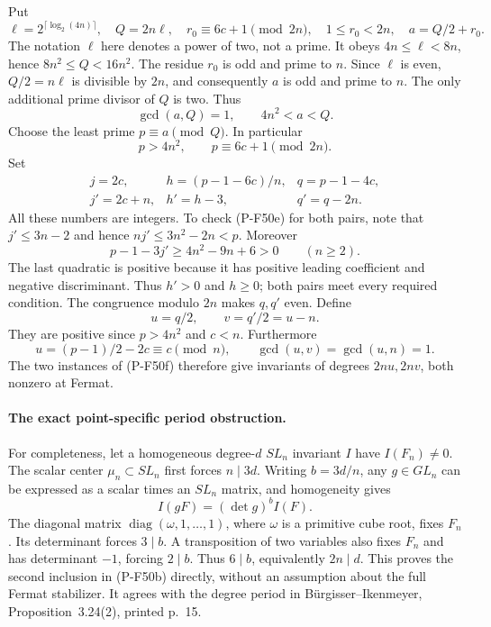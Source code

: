 Put
\[
 \ell=2^{\lceil\log_2(4n)\rceil},\quad Q=2n\ell,
 \quad r_0\equiv6c+1\pmod{2n},\quad 1\le r_0<2n,
 \quad a=Q/2+r_0.                                     \tag{P-F50k}
\]
The notation $\ell$ here denotes a power of two, not a
prime. It obeys $4n\le\ell<8n$, hence
$8n^2\le Q<16n^2$. The residue $r_0$ is odd and prime
to $n$. Since $\ell$ is even, $Q/2=n\ell$ is divisible
by $2n$, and consequently $a$ is odd and prime to $n$.
The only additional prime divisor of $Q$ is two.
Thus
\[
          \gcd(a,Q)=1,
                 \qquad4n^2<a<Q.                     \tag{P-F50l}
\]
Choose the least prime $p\equiv a\pmod Q$. In particular
\[
                 p>4n^2,
                 \qquad p\equiv6c+1\pmod{2n}.         \tag{P-F50m}
\]
Set
\[
 \begin{array}{lll}
 j=2c,&h=(p-1-6c)/n,&q=p-1-4c,\\
 j'=2c+n,&h'=h-3,&q'=q-2n.
 \end{array}                                           \tag{P-F50n}
\]
All these numbers are integers. To check (P-F50e) for
both pairs, note that $j'\le3n-2$ and hence
$nj'\le3n^2-2n<p$. Moreover
\[
 p-1-3j'\ge4n^2-9n+6>0\qquad(n\ge2).
\]
The last quadratic is positive because it has positive
leading coefficient and negative discriminant. Thus
$h'>0$ and $h\ge0$; both pairs meet every required
condition. The congruence modulo $2n$ makes $q,q'$ even.
Define
\[
                      u=q/2,\qquad v=q'/2=u-n.
                                                        \tag{P-F50o}
\]
They are positive since $p>4n^2$ and $c<n$.
Furthermore
\[
      u=(p-1)/2-2c\equiv c\pmod n,
          \qquad \gcd(u,v)=\gcd(u,n)=1.                \tag{P-F50p}
\]
The two instances of (P-F50f) therefore give invariants
of degrees $2nu,2nv$, both nonzero at Fermat.

\paragraph{The exact point-specific period obstruction.}
For completeness, let a homogeneous degree-$d$ $SL_n$
invariant $I$ have $I(F_n)\ne0$. The scalar center
$\mu_n\subset SL_n$ first forces $n\mid3d$.
Writing $b=3d/n$, any $g\in GL_n$ can be expressed as
a scalar times an $SL_n$ matrix, and homogeneity gives
\[
                         I(gF)=(\det g)^b I(F).
                                                        \tag{P-F50q}
\]
The diagonal matrix $\operatorname{diag}(\omega,1,\ldots,1)$,
where $\omega$ is a primitive cube root, fixes $F_n$.
Its determinant forces $3\mid b$. A transposition of
two variables also fixes $F_n$ and has determinant
$-1$, forcing $2\mid b$. Thus $6\mid b$, equivalently
$2n\mid d$. This proves the second inclusion in
(P-F50b) directly, without an assumption about the
full Fermat stabilizer. It agrees with the degree
period in B\"urgisser--Ikenmeyer, Proposition~3.24(2),
printed p.~15.

